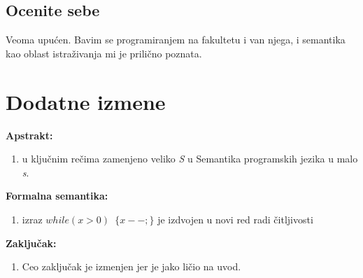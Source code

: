 \documentclass[a4paper]{report}
\begin{document}
\section{Ocenite sebe}
Veoma upućen. Bavim se programiranjem na fakultetu i van njega, i semantika kao oblast istraživanja mi je prilično poznata.


\chapter{Dodatne izmene}
\textbf{Apstrakt: }
\begin{enumerate}
\item u ključnim rečima zamenjeno veliko \textit{S} u Semantika programskih jezika u malo \textit{s}.
\end{enumerate}
\textbf{Formalna semantika:}
\begin{enumerate}
\item izraz \texttt{$ while(x > 0)$  $\lbrace x--;\rbrace$} je izdvojen u novi red radi čitljivosti
\end{enumerate}
\textbf{Zaključak:}
\begin{enumerate}
\item Ceo zaključak je izmenjen jer je jako ličio na uvod.
\end{enumerate}
\end{document}
